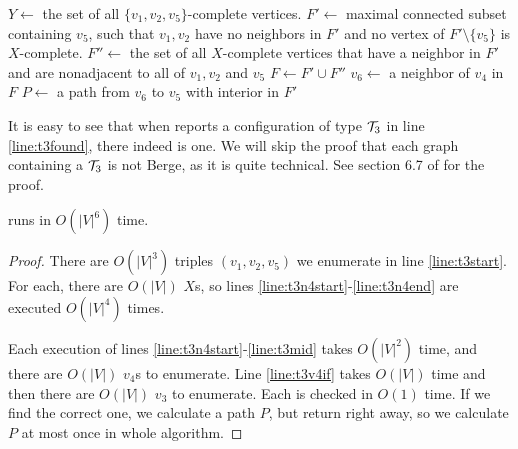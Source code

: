 \begin{algorithmic}[1]
		\ls $Y \gets$ the set of all $\{v_1, v_2, v_5\}$-complete vertices.
			\ls $F' \gets$ maximal connected subset containing $v_5$, such that $v_1, v_2$ \label{line:t3n4start}
			\lsx have no neighbors in $F'$ and no vertex of $F'\setminus\{v_5\}$ is $X$-complete.
			\ls $F'' \gets$ the set of all $X$-complete vertices that have a neighbor in 
			\lsx $F'$ and are nonadjacent to all of $v_1, v_2$ and $v_5$
			\ls $F \gets F' \cup F''$ \label{line:t3mid}
					\ls $v_6 \gets$ a neighbor of $v_4$ in $F$
							\ls $P \gets$ a path from $v_6$ to $v_5$ with interior in $F'$
							\ls \RETURN \TRUE {} \label{line:t3found}
						\mEndIf
					\mEndFor
				\mEndIf
			\mEndFor \label{line:t3n4end}
		\mEndFor
	\mEndFor
	\ls \RETURN \FALSE
	\mEndProcedure
\end{algorithmic}

It is easy to see that when  reports a configuration of type $\mathcal{T}_3$ in line \ref{line:t3found}, there indeed is one. We will skip the proof that each graph containing a $\mathcal{T}_3$ is not Berge, as it is quite technical. See section 6.7 of \cite{MC05} for the proof.

\begin{theorem}
	\label{thm:t3Time}
	 runs in $O(|V|^6)$ time.
\end{theorem}
\begin{proof}
	There are $O(|V|^3)$ triples $(v_1, v_2, v_5)$ we enumerate in line \ref{line:t3start}. For each, there are $O(|V|)$ $X$s, so lines \ref{line:t3n4start}-\ref{line:t3n4end} are executed $O(|V|^4)$ times.

	Each execution of lines \ref{line:t3n4start}-\ref{line:t3mid} takes $O(|V|^2)$ time, and there are $O(|V|)$ $v_4$s to enumerate. Line \ref{line:t3v4if} takes $O(|V|)$ time and then there are $O(|V|)$ $v_3$ to enumerate. Each is checked in $O(1)$ time. If we find the correct one, we calculate a path $P$, but return right away, so we calculate $P$ at most once in whole algorithm.
\end{proof}

